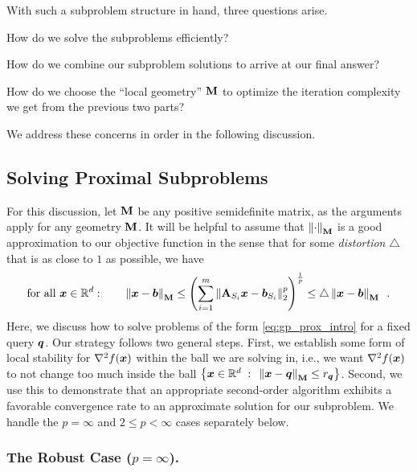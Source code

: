 With such a subproblem structure in hand, three questions arise. \begin{enumerate*}[label={(\arabic*)}] \item How do we solve the subproblems efficiently? \item How do we combine our subproblem solutions to arrive at our final answer?  \item How do we choose the ``local geometry'' $\mathbf{M}$ to optimize the iteration complexity we get from the previous two parts? \end{enumerate*} We address these concerns in order in the following discussion.

\subsection{Solving Proximal Subproblems}

For this discussion, let $\mathbf{M}$ be any positive semidefinite matrix, as the arguments apply for any geometry $\mathbf{M}$. It will be helpful to assume that $\left\lVert \cdot \right\rVert_{\mathbf{M}}$ is a good approximation to our objective function in the sense that for some \textit{distortion} $\triangle$ that is as close to $1$ as possible, we have
\begin{align*}
    \text{for all } \bm{x} \in \mathbb{R}^d:\quad\quad \left\lVert \bm{x} - \bm{b} \right\rVert_{\mathbf{M}} \le \left(\sum_{i=1}^m \left\lVert \mathbf{A}_{S_i}\bm{x}-\bm{b}_{S_i} \right\rVert_2^p\right)^{\frac{1}{p}} \le \triangle\left\lVert \bm{x} -\bm{b} \right\rVert_{\mathbf{M}}\enspace.
\end{align*}
Here, we discuss how to solve problems of the form \eqref{eq:gp_prox_intro} for a fixed query $\bm{q}$. Our strategy follows two general steps. First, we establish some form of local stability for $\nabla^2 f(\bm{x})$ within the ball we are solving in, i.e., we want $\nabla^2 f(\bm{x})$ to not change too much inside the ball $\left\{\bm{x}\in\mathbb{R}^d {\;\; : \;\;} \left\lVert \bm{x}-\bm{q} \right\rVert_{\mathbf{M}} \le r_{\bm{q}}\right\}$. Second, we use this to demonstrate that an appropriate second-order algorithm exhibits a favorable convergence rate to an approximate solution for our subproblem. We handle the $p=\infty$ and $2 \le p < \infty$ cases separately below.

\subsubsection{The Robust Case \texorpdfstring{($p=\infty$)}{(p=infinity)}.}
\label{sec:gp_reg_overview_robust_hessian}

